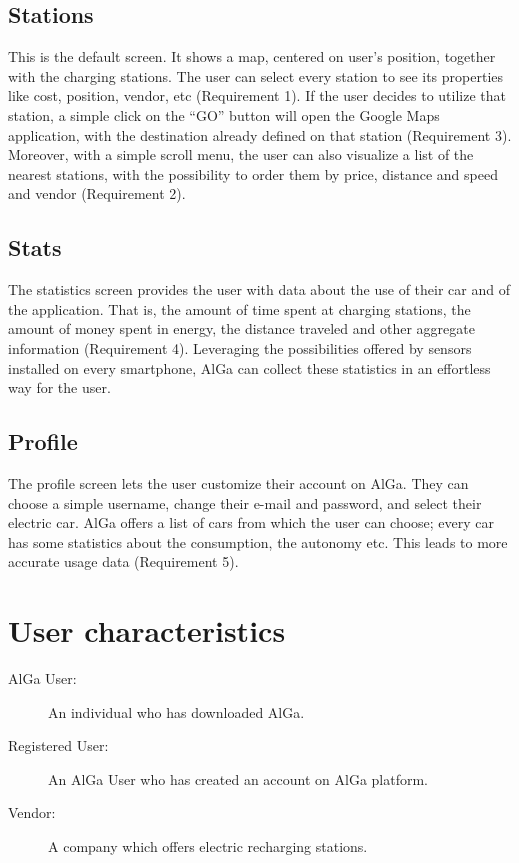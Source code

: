 \subsection*{Stations}
This is the default screen. It shows a map, centered on user's position, together with the charging stations. The user can select every station to see its properties like cost, position, vendor, etc (Requirement 1). If the user decides to utilize that station, a simple click on the ``GO'' button will open the Google Maps application, with the destination already defined on that station (Requirement 3).
Moreover, with a simple scroll menu, the user can also visualize a list of the nearest stations, with the possibility to order them by price, distance and speed and vendor (Requirement 2).

\subsection*{Stats}
The statistics screen provides the user with data about the use of their car and of the application. That is, the amount of time spent at charging stations, the amount of money spent in energy, the distance traveled and other aggregate information (Requirement 4). Leveraging the possibilities offered by sensors installed on every smartphone, AlGa can collect these statistics in an effortless way for the user.

\subsection*{Profile}
The profile screen lets the user customize their account on AlGa. They can choose a simple username, change their e-mail and password, and select their electric car. AlGa offers a list of cars from which the user can choose; every car has some statistics about the consumption, the autonomy etc. This leads to more accurate usage data (Requirement 5).

\section{User characteristics}
\begin{description}
\item[AlGa User:] An individual who has downloaded AlGa.
\item[Registered User:] An AlGa User who has created an account on AlGa platform.
\item[Vendor:] A company which offers electric recharging stations.
\end{description}

